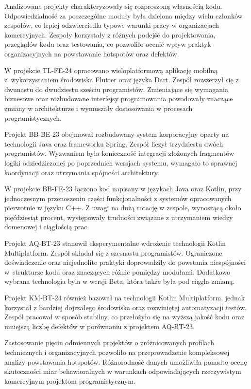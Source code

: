 Analizowane projekty charakteryzowały się rozproszoną własnością kodu. Odpowiedzialność za poszczególne moduły była dzielona między wielu członków zespołów, co lepiej odzwierciedla typowe warunki pracy w organizacjach komercyjnych. Zespoły korzystały z różnych podejść do projektowania, przeglądów kodu oraz testowania, co pozwoliło ocenić wpływ praktyk organizacyjnych na powstawanie hotspotów oraz defektów.

W projekcie TL-FE-24 opracowano wieloplatformową aplikację mobilną z~wykorzystaniem środowiska Flutter oraz języka Dart. Zespół rozszerzył się z dwunastu do dwudziestu sześciu programistów. Zmieniające się wymagania biznesowe oraz rozbudowane interfejsy programowania powodowały znaczące zmiany w architekturze i wymuszały dostosowania w procesach programistycznych.

Projekt BB-BE-23 obejmował rozbudowany system korporacyjny oparty na technologii Java oraz frameworku Spring. Zespół liczył trzydziestu dwóch programistów. Wyzwaniem była konieczność integracji złożonych fragmentów logiki odziedziczonej po poprzednich wersjach systemu, wymagało to sprawnej koordynacji oraz utrzymania spójności architektury.

W projekcie BB-FE-23 łączono kod napisany w językach Java oraz Kotlin, przy jednoczesnym przenoszeniu części funkcjonalności z systemów opracowanych pierwotnie w języku C++. Z uwagi na dużą rotację w zespole, wynoszącą około pięćdziesiąt procent, występowały trudności związane z utrzymaniem wiedzy domenowej i ciągłością prac.

Projekt AQ-BT-23 stanowił eksperymentalne wdrożenie technologii Kotlin Multiplatform. Zespół składał się z szesnastu programistów. Ograniczone doświadczenie oraz niejednolite praktyki doprowadziły do powstania niespójności w~strukturze kodu oraz znaczących różnic pomiędzy modułami. Dodatkowo wybrana technologia byla w wersji Beta, która także była pod ciągła zmianą.

Projekt KM-BT-24 również bazował na technologii Kotlin Multiplatform, jednak korzystał z bardziej dojrzałego środowiska oraz rozwiniętej automatyzacji testów. Zespół pracował w sposób stabilny, co przełożyło się na wyższą jakość kodu oraz mniejszą liczbę defektów w porównaniu z projektem AQ-BT-23.

Zastosowanie pięciu odmiennych projektów o zróżnicowanych profilach technicznych i organizacyjnych pozwoliło na przeprowadzenie kompleksowej analizy powstawania hotspotów. Różnorodność danych umożliwiła ponadto ocenę skuteczności miar behawioralnych w warunkach odpowiadających rzeczywistym komercyjnym projektom programistycznym.


